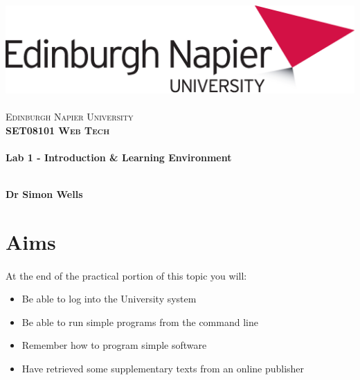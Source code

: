 \documentclass[10pt, a4paper, twosize]{article}
\begin{document}

\begin{titlepage}
\vspace*{5cm}
\begin{center}
\includegraphics[width=.5\textwidth]{images/EdNapUniLogoCMYK}~\\[1cm]

\textsc{\Large Edinburgh Napier University}\\[1.5cm]

\textsc{\LARGE \bfseries SET08101 Web Tech}\\[0.5cm]

\hrulefill \\[0.4cm]
{\huge \bfseries Lab 1 - Introduction \& Learning Environment \\[0.4cm] }
\hrulefill \\[1.5cm]

\begin{minipage}{0.4\textwidth}
\begin{flushleft} \large
\textbf{Dr Simon Wells} \\
\end{flushleft}
\end{minipage}

\vfill

\end{center}
\end{titlepage}




%

\section{Aims}
\paragraph{} At the end of the practical portion of this topic you will:

\begin{itemize}
\item Be able to log into the University system
\item Be able to run simple programs from the command line
\item Remember how to program simple software
\item Have retrieved some supplementary texts from an online publisher
\end{itemize}
\end{document}
